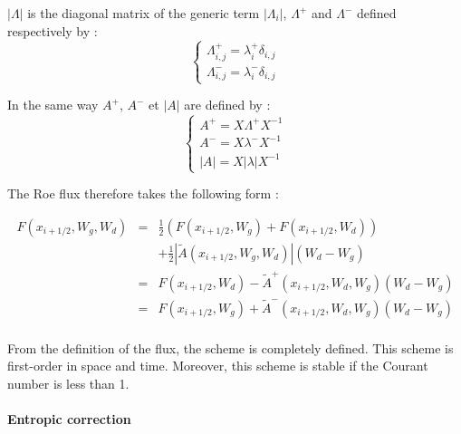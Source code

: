 \vspace{0.5cm}

$|\Lambda|$ is the diagonal matrix of the generic term $|\Lambda_i|$, $\Lambda^{+}$ and $\Lambda^{-}$ defined respectively by :
\begin{equation}
  \left \lbrace
  \begin{array}{l}
   \Lambda_{i,j}^{+}  = \lambda_{i}^{+} \delta_{i,j}\\
   \Lambda_{i,j}^{-}  = \lambda_{i}^{-} \delta_{i,j}
\end{array}
 \right.
\end{equation}

\vspace{0.5cm}

In the same way $A^+$, $A^-$ et $|A|$ are defined by :
\begin{equation}
  \left \lbrace
  \begin{array}{l}
   A^{+}  = X \Lambda^{+} X^{-1} \\
   A^{-}  = X \lambda^{-} X^{-1} \\
   |A| = X |\lambda| X^{-1} 
\end{array}
 \right.
\end{equation}

\vspace{0.5cm}

The Roe flux therefore takes the following form :

\begin{eqnarray}
 F(x_{i+1/2},W_g,W_d) & = & \frac{1}{2} \left ( F(x_{i+1/2},W_g) + F(x_{i+1/2},W_d) \right ) \nonumber \\
                      &   & + \frac{1}{2} \left | \tilde{A}(x_{i+1/2},W_g,W_d) \right | (W_d -W_g) \nonumber \\
 & = & F(x_{i+1/2},W_d) - \tilde{A}^+ (x_{i+1/2},W_d,W_g) (W_d - W_g) \nonumber \\
 & = & F(x_{i+1/2},W_g) + \tilde{A}^- (x_{i+1/2},W_d,W_g) (W_d - W_g) \nonumber \\
 & & 
\end{eqnarray}

\vspace{0.5cm}

From the definition of the flux, the scheme is completely defined. This scheme is first-order in space and time.  Moreover, this scheme is stable if the Courant number is less than 1.

\paragraph{Entropic correction\\}

